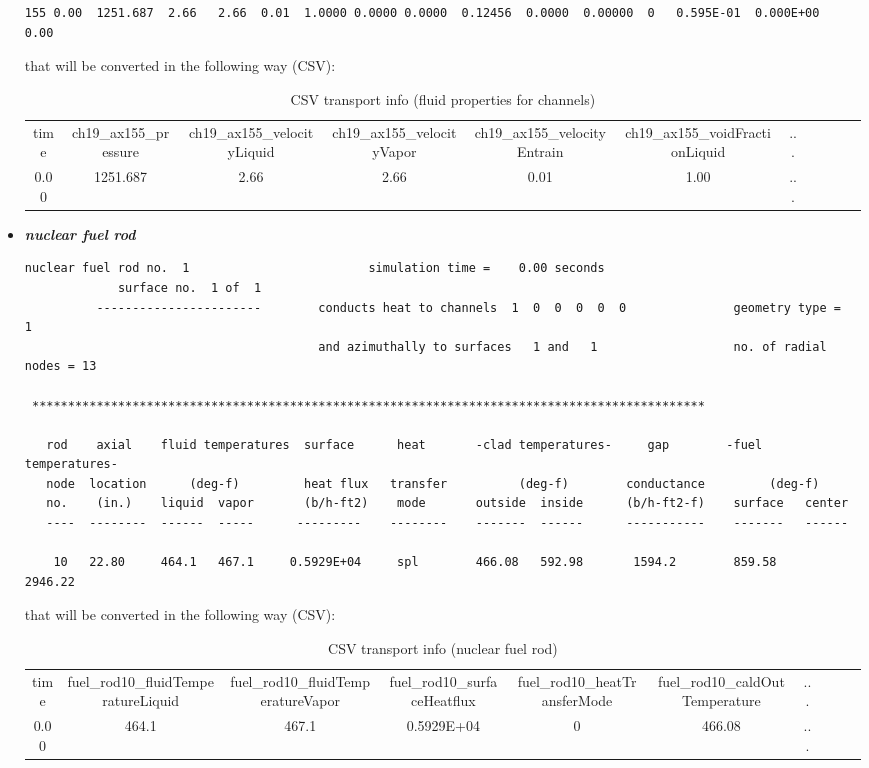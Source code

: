 \begin{itemize}
\begin{lstlisting}[basicstyle=\tiny]
 155 0.00  1251.687  2.66   2.66  0.01  1.0000 0.0000 0.0000  0.12456  0.0000  0.00000  0   0.595E-01  0.000E+00   0.00

  \end{lstlisting}
   that will be converted in the following way (CSV):
   \begin{table}[h]
    \centering
    \caption{CSV transport info (fluid properties for channels)}
    \label{CSVfluidProperties}
    \tabcolsep=0.11cm
    \tiny
    \begin{tabular}{|c|c|c|c|c|c|c|c|c|c|c|}
     time & ch19\_ax155\_pressure  & ch19\_ax155\_velocityLiquid & ch19\_ax155\_velocityVapor & ch19\_ax155\_velocityEntrain & ch19\_ax155\_voidFractionLiquid & ...\\
     0.00 & 1251.687 & 2.66           & 2.66   & 0.01        & 1.00 & ... 
    \end{tabular}
   \end{table}
   
  \item \textit{\textbf{nuclear fuel rod}}
  \begin{lstlisting}[basicstyle=\tiny]
          nuclear fuel rod no.  1                         simulation time =    0.00 seconds
             surface no.  1 of  1
          -----------------------        conducts heat to channels  1  0  0  0  0  0               geometry type =  1
                                         and azimuthally to surfaces   1 and   1                   no. of radial nodes = 13

 **********************************************************************************************

   rod    axial    fluid temperatures  surface      heat       -clad temperatures-     gap        -fuel temperatures-
   node  location      (deg-f)         heat flux   transfer          (deg-f)        conductance         (deg-f)
   no.    (in.)    liquid  vapor       (b/h-ft2)    mode       outside  inside      (b/h-ft2-f)    surface   center
   ----  --------  ------  -----      ---------    --------    -------  ------      -----------    -------   ------

    10   22.80     464.1   467.1     0.5929E+04     spl        466.08   592.98       1594.2        859.58     2946.22
\end{lstlisting}
   that will be converted in the following way (CSV):
   \begin{table}[h]
     \centering
     \caption{CSV transport info (nuclear fuel rod)}
     \label{CSVfuelRod}
     \tabcolsep=0.11cm
     \tiny
     \begin{tabular}{|c|c|c|c|c|c|c|c|c|c|}
     time    & fuel\_rod10\_fluidTemperatureLiquid  & fuel\_rod10\_fluidTemperatureVapor & fuel\_rod10\_surfaceHeatflux & fuel\_rod10\_heatTransferMode & fuel\_rod10\_caldOutTemperature & ...  \\ 
     0.00 & 464.1 & 467.1  & 0.5929E+04               & 0        & 466.08         & ...                      
     \end{tabular}
   \end{table}   
   

\end{itemize}
